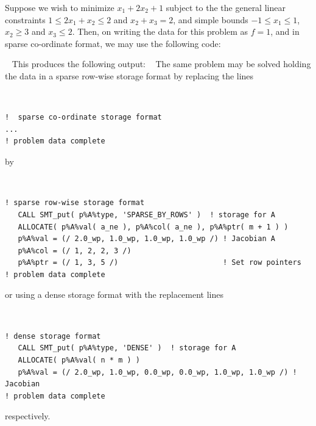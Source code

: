 \documentclass{galahad}
\begin{document}

\galexample
Suppose we wish to minimize
$x_1 + 2 x_2 + 1$
subject to the the general linear constraints
$1 \leq  2 x_{1}  +  x_{2}  \leq  2$ and
$x_{2}  +  x_{3}  =  2$, and simple bounds
$-1  \leq  x_{1}  \leq  1$, $x_2 \geq 3$  and $x_{3}  \leq  2$.
Then, on writing the data for this problem as $f = 1$,
and
in sparse co-ordinate format,
we may use the following code:

{\tt \small
\VerbatimInput{\packageexample}
}
\noindent
This produces the following output:
{\tt \small
\VerbatimInput{\packageresults}
}
\noindent
The same problem may be solved holding the data in
a sparse row-wise storage format by replacing the lines
{\tt \small
\begin{verbatim}
!  sparse co-ordinate storage format
...
! problem data complete
\end{verbatim}
}
\noindent
by
{\tt \small
\begin{verbatim}
! sparse row-wise storage format
   CALL SMT_put( p%A%type, 'SPARSE_BY_ROWS' )  ! storage for A
   ALLOCATE( p%A%val( a_ne ), p%A%col( a_ne ), p%A%ptr( m + 1 ) )
   p%A%val = (/ 2.0_wp, 1.0_wp, 1.0_wp, 1.0_wp /) ! Jacobian A
   p%A%col = (/ 1, 2, 2, 3 /)
   p%A%ptr = (/ 1, 3, 5 /)                        ! Set row pointers
! problem data complete
\end{verbatim}
}
\noindent
or using a dense storage format with the replacement lines
{\tt \small
\begin{verbatim}
! dense storage format
   CALL SMT_put( p%A%type, 'DENSE' )  ! storage for A
   ALLOCATE( p%A%val( n * m ) )
   p%A%val = (/ 2.0_wp, 1.0_wp, 0.0_wp, 0.0_wp, 1.0_wp, 1.0_wp /) ! Jacobian
! problem data complete
\end{verbatim}
}
\noindent
respectively.
\end{document}
